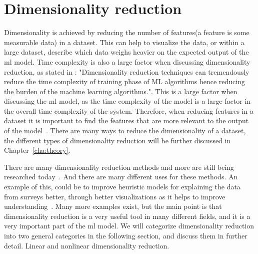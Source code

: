 

\section{Dimensionality reduction}\label{sec:dimensionality-reduction-problem}
Dimensionality is achieved by reducing the number of features(a feature is some measurable data) in a dataset. This can help to visualize the data, or within a large dataset, describe which data weighs heavier on the expected output of the \gls{ml} model. Time complexity is also a large factor when discussing dimensionality reduction, as stated in \cite{Analysis-of-Dimensionality-Reduction-Techniques-on-Big-Data}: "Dimensionality reduction techniques can tremendously reduce the time complexity of training phase of ML algorithms hence reducing the burden of the machine learning algorithms.". This is a large factor when discussing the \gls{ml} model, as the time complexity of the model is a large factor in the overall time complexity of the system. Therefore, when reducing features in a dataset it is important to find the features that are more relevant to the output of the model~\cite{Feature-engineering-zheng}. There are many ways to reduce the dimensionality of a dataset, the different types of dimensionality reduction will be further discussed in Chapter~\ref{cha:theory}.

There are many dimensionality reduction methods and more are still being researched today~\cite{dimensionality-reduction-cheng}. And there are many different uses for these methods. An example of this, could be to improve heuristic models for explaining the data from surveys better, through better visualizations as it helps to improve understanding~\cite{dimensionality-reduction-cheng}. Many more examples exist, but the main point is that dimensionality reduction is a very useful tool in many different fields, and it is a very important part of the \gls{ml} model. We will categorize dimensionality reduction into two general categories in the following section, and discuss them in further detail. Linear and nonlinear dimensionality reduction.

